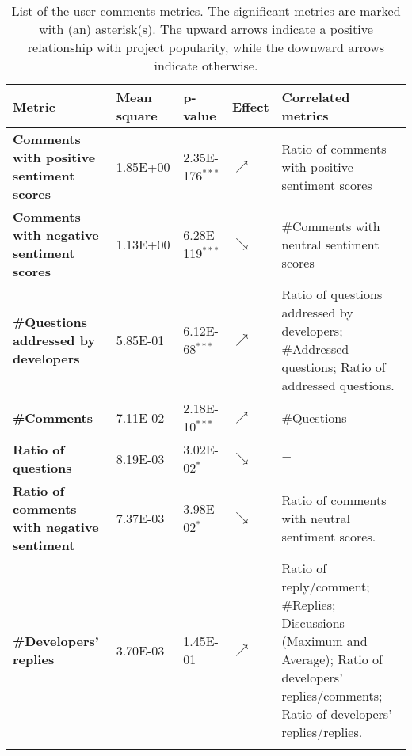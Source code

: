 \begin{table*}
	\vspace{-4.1cm}
	\centering
	\caption{List of the user comments metrics. The significant metrics are
	marked with (an) asterisk(s). The upward arrows indicate a positive
	relationship with project popularity, while the downward arrows
	indicate otherwise.\label{table:RQ2}}
	\scriptsize
	\tabcolsep=0.1cm
	\begin{tabularx}{\columnwidth}{>{\bfseries}L{0.21\columnwidth}R{0.15\columnwidth}R{0.2\columnwidth}C{0.1\columnwidth}L{0.26\columnwidth}}
		\toprule
		 {\bfseries Metric} & {\bfseries Mean square} & {\bfseries p-value} & {\bfseries Effect} & {\bfseries Correlated metrics}  \\
		\midrule
		Comments with positive sentiment scores & 1.85E+00 & 2.35E-176$^{\ast\ast\ast}$ & $\nearrow$ & Ratio of comments with positive sentiment scores \\
		\midrule
		Comments with negative sentiment scores & 1.13E+00 & 6.28E-119$^{\ast\ast\ast}$ & $\searrow$ & \#Comments with neutral sentiment scores\\ 
		\midrule
		\#Questions addressed by developers & 5.85E-01 & 6.12E-68$^{\ast\ast\ast}$  & $\nearrow$ & Ratio of questions addressed by developers; \#Addressed questions; Ratio of addressed questions. \\
		\midrule
		\#Comments & 7.11E-02 & 2.18E-10$^{\ast\ast\ast}$  & $\nearrow$ & \#Questions \\ 
		\midrule
		Ratio of questions  & 8.19E-03 & 3.02E-02$^{\ast}$ & $\searrow$ & $-$  \\ 
		\midrule
		Ratio of comments with negative sentiment & 7.37E-03 & 3.98E-02$^{\ast}$ & $\searrow$ & Ratio of comments with neutral sentiment scores. \\
		\midrule
		\#Developers' replies & 3.70E-03 & 1.45E-01 & $\nearrow$ & Ratio of reply/comment; \#Replies; Discussions (Maximum and Average); Ratio of developers' replies/comments; Ratio of developers' replies/replies.\\ 
		\bottomrule
		\\
	\end{tabularx}
\end{table*}
